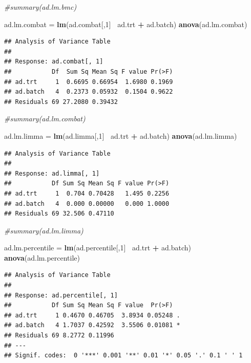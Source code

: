 \documentclass[]{book}
\newenvironment{Shaded}{\begin{snugshade}}{\end{snugshade}}
\newcommand{\KeywordTok}[1]{\textcolor[rgb]{0.13,0.29,0.53}{\textbf{#1}}}
\newcommand{\DecValTok}[1]{\textcolor[rgb]{0.00,0.00,0.81}{#1}}
\newcommand{\StringTok}[1]{\textcolor[rgb]{0.31,0.60,0.02}{#1}}
\newcommand{\CommentTok}[1]{\textcolor[rgb]{0.56,0.35,0.01}{\textit{#1}}}
\newcommand{\OperatorTok}[1]{\textcolor[rgb]{0.81,0.36,0.00}{\textbf{#1}}}
\newcommand{\NormalTok}[1]{#1}
\begin{document}
\begin{Shaded}
\begin{Highlighting}[]
\CommentTok{#summary(ad.lm.bmc)}

\NormalTok{ad.lm.combat =}\StringTok{ }\KeywordTok{lm}\NormalTok{(ad.combat[,}\DecValTok{1}\NormalTok{]}\OperatorTok{~}\StringTok{ }\NormalTok{ad.trt }\OperatorTok{+}\StringTok{ }\NormalTok{ad.batch)}
\KeywordTok{anova}\NormalTok{(ad.lm.combat)}
\end{Highlighting}
\end{Shaded}

\begin{verbatim}
## Analysis of Variance Table
## 
## Response: ad.combat[, 1]
##           Df  Sum Sq Mean Sq F value Pr(>F)
## ad.trt     1  0.6695 0.66954  1.6980 0.1969
## ad.batch   4  0.2373 0.05932  0.1504 0.9622
## Residuals 69 27.2080 0.39432
\end{verbatim}

\begin{Shaded}
\begin{Highlighting}[]
\CommentTok{#summary(ad.lm.combat)}

\NormalTok{ad.lm.limma =}\StringTok{ }\KeywordTok{lm}\NormalTok{(ad.limma[,}\DecValTok{1}\NormalTok{]}\OperatorTok{~}\StringTok{ }\NormalTok{ad.trt }\OperatorTok{+}\StringTok{ }\NormalTok{ad.batch)}
\KeywordTok{anova}\NormalTok{(ad.lm.limma)}
\end{Highlighting}
\end{Shaded}

\begin{verbatim}
## Analysis of Variance Table
## 
## Response: ad.limma[, 1]
##           Df Sum Sq Mean Sq F value Pr(>F)
## ad.trt     1  0.704 0.70428   1.495 0.2256
## ad.batch   4  0.000 0.00000   0.000 1.0000
## Residuals 69 32.506 0.47110
\end{verbatim}

\begin{Shaded}
\begin{Highlighting}[]
\CommentTok{#summary(ad.lm.limma)}

\NormalTok{ad.lm.percentile =}\StringTok{ }\KeywordTok{lm}\NormalTok{(ad.percentile[,}\DecValTok{1}\NormalTok{]}\OperatorTok{~}\StringTok{ }\NormalTok{ad.trt }\OperatorTok{+}\StringTok{ }\NormalTok{ad.batch)}
\KeywordTok{anova}\NormalTok{(ad.lm.percentile)}
\end{Highlighting}
\end{Shaded}

\begin{verbatim}
## Analysis of Variance Table
## 
## Response: ad.percentile[, 1]
##           Df Sum Sq Mean Sq F value  Pr(>F)  
## ad.trt     1 0.4670 0.46705  3.8934 0.05248 .
## ad.batch   4 1.7037 0.42592  3.5506 0.01081 *
## Residuals 69 8.2772 0.11996                  
## ---
## Signif. codes:  0 '***' 0.001 '**' 0.01 '*' 0.05 '.' 0.1 ' ' 1
\end{verbatim}
\end{document}
